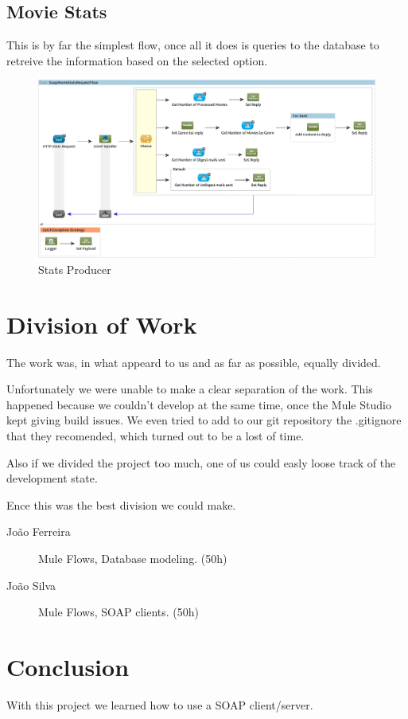 \documentclass[12pt]{article}
\begin{document}
\subsection{Movie Stats}
\indent \indent This is by far the simplest flow, once all it does is queries to the database to retreive the information based on the selected option.

\begin{figure}[h!]
	\centering
	\includegraphics[width=\textwidth]{SoapMovieStatsRequestFlow.png}
	\caption{Stats Producer}
\end{figure}
\clearpage

\section{Division of Work}
\indent \indent The work was, in what appeard to us and as far as possible, equally divided.

Unfortunately we were unable to make a clear separation of the work. This happened because we couldn't develop at the same time, once the Mule Studio kept giving build issues. We even tried to add to our git repository the .gitignore that they recomended, which turned out to be a lost of time.

Also if we divided the project too much, one of us could easly loose track of the development state.

Ence this was the best division we could make.

\begin{description}
	\item [João Ferreira] Mule Flows, Database modeling. (50h)
	\item [João Silva] Mule Flows, SOAP clients. (50h)
\end{description}
\clearpage

\section{Conclusion}
\indent \indent With this project we learned how to use a SOAP client/server. 
\end{document}
